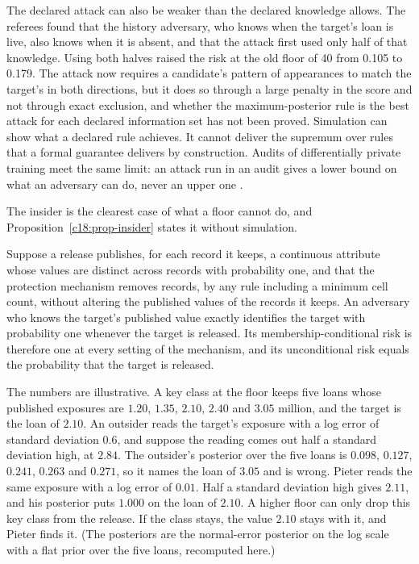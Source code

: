The declared attack can also be weaker than the declared knowledge allows. The
referees found that the history adversary, who knows when the target's loan is live,
also knows when it is absent, and that the attack first used only half of that
knowledge. Using both halves raised the risk at the old floor of 40 from 0.105 to
0.179. %
The attack now requires a candidate's pattern of appearances to match the target's in
both directions, but it does so through a large penalty in the score and not through
exact exclusion, and whether the maximum-posterior rule is the best attack for each
declared information set has not been proved. %
Simulation can show what a declared rule achieves. It cannot deliver the supremum over
rules that a formal guarantee delivers by construction. Audits of differentially
private training meet the same limit: an attack run in an audit gives a lower bound
on what an adversary can do, never an upper one \citep{jagielski2020,steinke2023}.

The insider is the clearest case of what a floor cannot do, and
Proposition~\ref{c18:prop-insider} states it without simulation.

\begin{proposition}\label{c18:prop-insider}
Suppose a release publishes, for each record it keeps, a continuous attribute whose
values are distinct across records with probability one, and that the protection
mechanism removes records, by any rule including a minimum cell count, without
altering the published values of the records it keeps. An adversary who knows the
target's published value exactly identifies the target with probability one whenever
the target is released. Its membership-conditional risk is therefore one at every
setting of the mechanism, and its unconditional risk equals the probability that the
target is released.
\end{proposition}

\begin{example}\label{c18:ex-pieter}
The numbers are illustrative. A key class at the floor keeps five loans whose published
exposures are $1.20$, $1.35$, $2.10$, $2.40$ and $3.05$ million, and the target is the loan of $2.10$.
An outsider reads the target's exposure with a log error of standard deviation $0.6$, and
suppose the reading comes out half a standard deviation high, at $2.84$. The outsider's
posterior over the five loans is $0.098$, $0.127$, $0.241$, $0.263$ and $0.271$, so it names the loan of
$3.05$ and is wrong. Pieter reads the same exposure with a log error of $0.01$. Half a standard
deviation high gives $2.11$, and his posterior puts $1.000$ on the loan of $2.10$. A higher floor can
only drop this key class from the release. If the class stays, the value $2.10$ stays with it,
and Pieter finds it. (The posteriors are the normal-error posterior on the log scale with a
flat prior over the five loans, recomputed here.)
\end{example}

